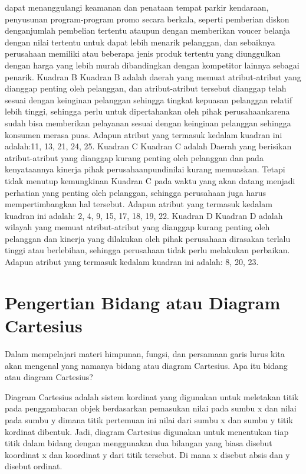 dapat menanggulangi keamanan dan penataan tempat parkir kendaraan, penyusunan program-program promo secara berkala, seperti pemberian diskon denganjumlah pembelian tertentu ataupun dengan
memberikan voucer belanja dengan nilai tertentu untuk dapat lebih menarik pelanggan, dan sebaiknya perusahaan memiliki atau beberapa jenis produk tertentu
yang diunggulkan dengan harga yang lebih murah dibandingkan dengan kompetitor lainnya sebagai penarik.
Kuadran B
Kuadran B adalah daerah yang memuat atribut-atribut yang dianggap penting oleh pelanggan, dan atribut-atribut tersebut dianggap telah sesuai dengan keinginan
pelanggan sehingga tingkat kepuasan pelanggan relatif lebih tinggi, sehingga perlu untuk dipertahankan oleh pihak perusahaankarena sudah bisa memberikan pelayanan
sesuai dengan keinginan pelanggan sehingga konsumen merasa puas. Adapun atribut yang termasuk kedalam kuadran ini adalah:11, 13, 21, 24, 25.
Kuadran C
Kuadran C adalah Daerah yang berisikan atribut-atribut yang dianggap kurang penting oleh pelanggan dan pada kenyataannya kinerja pihak perusahaanpundinilai kurang memuaskan. Tetapi tidak
menutup kemungkinan Kuadran C pada waktu yang akan datang menjadi perhatian yang penting oleh pelanggan, sehingga perusahaan juga harus mempertimbangkan
hal tersebut. Adapun atribut yang termasuk kedalam kuadran ini adalah: 2, 4, 9, 15, 17, 18, 19, 22.
Kuadran D
Kuadran D adalah wilayah yang memuat atribut-atribut yang dianggap kurang penting oleh pelanggan dan kinerja yang dilakukan oleh pihak perusahaan dirasakan
terlalu tinggi atau berlebihan, sehingga perusahaan tidak perlu melakukan perbaikan. Adapun atribut yang termasuk kedalam kuadran ini adalah: 8, 20, 23.

\section{Pengertian Bidang atau Diagram Cartesius}

Dalam mempelajari materi himpunan, fungsi, dan persamaan garis lurus kita akan mengenal yang namanya bidang atau diagram Cartesius. Apa itu bidang atau diagram Cartesius?

Diagram Cartesius adalah sistem kordinat yang digunakan untuk meletakan titik pada penggambaran objek berdasarkan pemasukan nilai pada sumbu x dan nilai pada sumbu y dimana titik pertemuan ini nilai dari sumbu x dan sumbu y titik kordinat dibentuk. Jadi, diagram Cartesius digunakan untuk menentukan tiap titik dalam bidang dengan menggunakan dua bilangan yang biasa disebut koordinat x dan koordinat y dari titik tersebut. Di mana x disebut absis dan y disebut ordinat.

